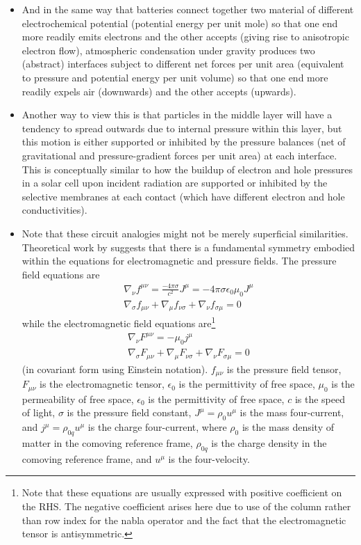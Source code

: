 \begin{itemize}
	\item And in the same way that batteries connect together two material of different electrochemical potential (potential energy per unit mole) so that one end more readily emits electrons and the other accepts (giving rise to anisotropic electron flow), atmospheric condensation under gravity produces two (abstract) interfaces subject to different net forces per unit area (equivalent to pressure and potential energy per unit volume) so that one end more readily expels air (downwards) and the other accepts (upwards).
	\item Another way to view this is that particles in the middle layer will have a tendency to spread outwards due to internal pressure within this layer, but this motion is either supported or inhibited by the pressure balances (net of gravitational and pressure-gradient forces per unit area) at each interface. This is conceptually similar to how the buildup of electron and hole pressures in a solar cell upon incident radiation are supported or inhibited by the selective membranes at each contact (which have different electron and hole conductivities).
	\item Note that these circuit analogies might not be merely superficial similarities. Theoretical work by \citet{fedosin2015} suggests that there is a fundamental symmetry embodied within the equations for electromagnetic and pressure fields. The pressure field equations are
	\begin{eqnarray}
		\nabla_\nu f^{\mu \nu} = \frac{- 4 \pi \sigma}{c^2} J^\mu = -4 \pi \sigma \epsilon_0 \mu_0 J^\mu \\
		\nabla_\sigma f_{\mu \nu} + \nabla_\mu f_{\nu \sigma} + \nabla_\nu f_{\sigma \mu} = 0
	\end{eqnarray}
	while the electromagnetic field equations are\footnote{Note that these equations are usually expressed with positive coefficient on the RHS. The negative coefficient arises here due to use of the column rather than row index for the nabla operator and the fact that the electromagnetic tensor is antisymmetric.}
	\begin{eqnarray}
		\nabla_\nu F^{\mu \nu} = - \mu_0 j^\mu \\
		\nabla_\sigma F_{\mu \nu} + \nabla_\mu F_{\nu \sigma} + \nabla_\nu F_{\sigma \mu} = 0
	\end{eqnarray}
	(in covariant form using Einstein notation). $f_{\mu \nu}$ is the pressure field tensor, $F_{\mu \nu}$ is the electromagnetic tensor, $\epsilon_0$ is the permittivity of free space, $\mu_0$ is the permeability of free space, $\epsilon_0$ is the permittivity of free space, $c$ is the speed of light, $\sigma$ is the pressure field constant, $J^\mu = \rho_0 u^\mu$ is the mass four-current, and $j^\mu = \rho_{0q} u^\mu$ is the charge four-current, where $\rho_0$ is the mass density of matter in the comoving reference frame, $\rho_{0q}$ is the charge density in the comoving reference frame, and $u^\mu$ is the four-velocity.

\end{itemize}
